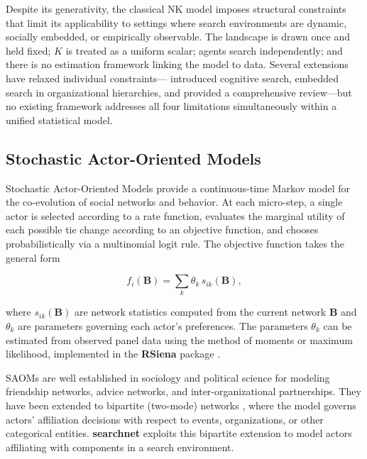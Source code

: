 \documentclass[
]{article}
\begin{document}
Despite its generativity, the classical NK model imposes structural
constraints that limit its applicability to settings where search
environments are dynamic, socially embedded, or empirically observable.
The landscape is drawn once and held fixed; \(K\) is treated as a
uniform scalar; agents search independently; and there is no estimation
framework linking the model to data. Several extensions have relaxed
individual constraints---\citet{Gavetti2005} introduced cognitive
search, \citet{SiggelkowRivkin2005} embedded search in organizational
hierarchies, and \citet{Baumann2019} provided a comprehensive
review---but no existing framework addresses all four limitations
simultaneously within a unified statistical model.

\subsection{Stochastic Actor-Oriented
Models}\label{stochastic-actor-oriented-models}

Stochastic Actor-Oriented Models \citep{Snijders1996,
SnijdersVdBuntSteglich2010} provide a continuous-time Markov model for
the co-evolution of social networks and behavior. At each micro-step, a
single actor is selected according to a rate function, evaluates the
marginal utility of each possible tie change according to an objective
function, and chooses probabilistically via a multinomial logit rule.
The objective function takes the general form

\begin{equation}\label{eq:saom-objective}
  f_i(\mathbf{B}) = \sum_k \theta_k \, s_{ik}(\mathbf{B}),
\end{equation}

\noindent where \(s_{ik}(\mathbf{B})\) are network statistics computed
from the current network \(\mathbf{B}\) and \(\theta_k\) are parameters
governing each actor's preferences. The parameters \(\theta_k\) can be
estimated from observed panel data using the method of moments or
maximum likelihood, implemented in the \textbf{RSiena} package
\citep{Ripley2022}.

SAOMs are well established in sociology and political science for
modeling friendship networks, advice networks, and inter-organizational
partnerships. They have been extended to bipartite (two-mode) networks
\citep{Koskinen2012}, where the model governs actors' affiliation
decisions with respect to events, organizations, or other categorical
entities. \textbf{searchnet} exploits this bipartite extension to model
actors affiliating with components in a search environment.
\end{document}
